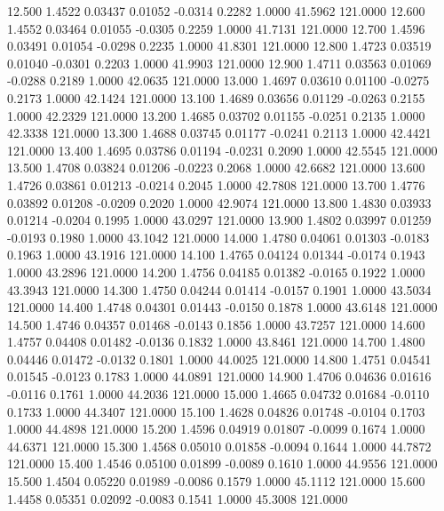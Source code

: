   12.500   1.4522   0.03437   0.01052  -0.0314   0.2282   1.0000  41.5962 121.0000
  12.600   1.4552   0.03464   0.01055  -0.0305   0.2259   1.0000  41.7131 121.0000
  12.700   1.4596   0.03491   0.01054  -0.0298   0.2235   1.0000  41.8301 121.0000
  12.800   1.4723   0.03519   0.01040  -0.0301   0.2203   1.0000  41.9903 121.0000
  12.900   1.4711   0.03563   0.01069  -0.0288   0.2189   1.0000  42.0635 121.0000
  13.000   1.4697   0.03610   0.01100  -0.0275   0.2173   1.0000  42.1424 121.0000
  13.100   1.4689   0.03656   0.01129  -0.0263   0.2155   1.0000  42.2329 121.0000
  13.200   1.4685   0.03702   0.01155  -0.0251   0.2135   1.0000  42.3338 121.0000
  13.300   1.4688   0.03745   0.01177  -0.0241   0.2113   1.0000  42.4421 121.0000
  13.400   1.4695   0.03786   0.01194  -0.0231   0.2090   1.0000  42.5545 121.0000
  13.500   1.4708   0.03824   0.01206  -0.0223   0.2068   1.0000  42.6682 121.0000
  13.600   1.4726   0.03861   0.01213  -0.0214   0.2045   1.0000  42.7808 121.0000
  13.700   1.4776   0.03892   0.01208  -0.0209   0.2020   1.0000  42.9074 121.0000
  13.800   1.4830   0.03933   0.01214  -0.0204   0.1995   1.0000  43.0297 121.0000
  13.900   1.4802   0.03997   0.01259  -0.0193   0.1980   1.0000  43.1042 121.0000
  14.000   1.4780   0.04061   0.01303  -0.0183   0.1963   1.0000  43.1916 121.0000
  14.100   1.4765   0.04124   0.01344  -0.0174   0.1943   1.0000  43.2896 121.0000
  14.200   1.4756   0.04185   0.01382  -0.0165   0.1922   1.0000  43.3943 121.0000
  14.300   1.4750   0.04244   0.01414  -0.0157   0.1901   1.0000  43.5034 121.0000
  14.400   1.4748   0.04301   0.01443  -0.0150   0.1878   1.0000  43.6148 121.0000
  14.500   1.4746   0.04357   0.01468  -0.0143   0.1856   1.0000  43.7257 121.0000
  14.600   1.4757   0.04408   0.01482  -0.0136   0.1832   1.0000  43.8461 121.0000
  14.700   1.4800   0.04446   0.01472  -0.0132   0.1801   1.0000  44.0025 121.0000
  14.800   1.4751   0.04541   0.01545  -0.0123   0.1783   1.0000  44.0891 121.0000
  14.900   1.4706   0.04636   0.01616  -0.0116   0.1761   1.0000  44.2036 121.0000
  15.000   1.4665   0.04732   0.01684  -0.0110   0.1733   1.0000  44.3407 121.0000
  15.100   1.4628   0.04826   0.01748  -0.0104   0.1703   1.0000  44.4898 121.0000
  15.200   1.4596   0.04919   0.01807  -0.0099   0.1674   1.0000  44.6371 121.0000
  15.300   1.4568   0.05010   0.01858  -0.0094   0.1644   1.0000  44.7872 121.0000
  15.400   1.4546   0.05100   0.01899  -0.0089   0.1610   1.0000  44.9556 121.0000
  15.500   1.4504   0.05220   0.01989  -0.0086   0.1579   1.0000  45.1112 121.0000
  15.600   1.4458   0.05351   0.02092  -0.0083   0.1541   1.0000  45.3008 121.0000
